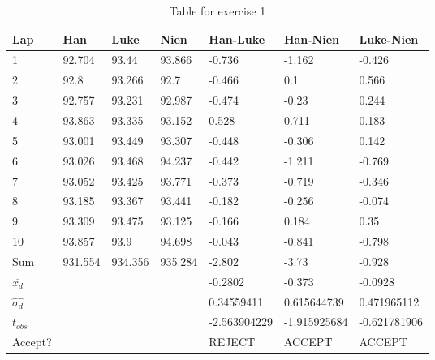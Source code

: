 \documentclass[fontsize=12pt, usenames, dvipsnames, headinclude, headsepline, footinclude, footsepline]{scrartcl}
\begin{document}
\begin{table}[]
\centering
\caption{Table for exercise 1}
\label{table:ex1}
\begin{tabular}{@{}lllllll@{}}
\toprule
Lap                  & Han     & Luke    & Nien    & Han-Luke     & Han-Nien     & Luke-Nien    \\ \midrule
1                    & 92.704  & 93.44   & 93.866  & -0.736       & -1.162       & -0.426       \\
2                    & 92.8    & 93.266  & 92.7    & -0.466       & 0.1          & 0.566        \\
3                    & 92.757  & 93.231  & 92.987  & -0.474       & -0.23        & 0.244        \\
4                    & 93.863  & 93.335  & 93.152  & 0.528        & 0.711        & 0.183        \\
5                    & 93.001  & 93.449  & 93.307  & -0.448       & -0.306       & 0.142        \\
6                    & 93.026  & 93.468  & 94.237  & -0.442       & -1.211       & -0.769       \\
7                    & 93.052  & 93.425  & 93.771  & -0.373       & -0.719       & -0.346       \\
8                    & 93.185  & 93.367  & 93.441  & -0.182       & -0.256       & -0.074       \\
9                    & 93.309  & 93.475  & 93.125  & -0.166       & 0.184        & 0.35         \\
10                   & 93.857  & 93.9    & 94.698  & -0.043       & -0.841       & -0.798       \\ \midrule
Sum                  & 931.554 & 934.356 & 935.284 & -2.802       & -3.73        & -0.928       \\ \midrule
$\overline{x_d}$     &         &         &         & -0.2802      & -0.373       & -0.0928      \\ \midrule
$\widehat{\sigma_d}$ &         &         &         & 0.34559411   & 0.615644739  & 0.471965112  \\ \midrule
$t_{obs}$              &         &         &         & -2.563904229 & -1.915925684 & -0.621781906 \\ \midrule
Accept?              &         &         &         & REJECT       & ACCEPT       & ACCEPT       \\ \bottomrule
\end{tabular}
\end{table}
\end{document}
